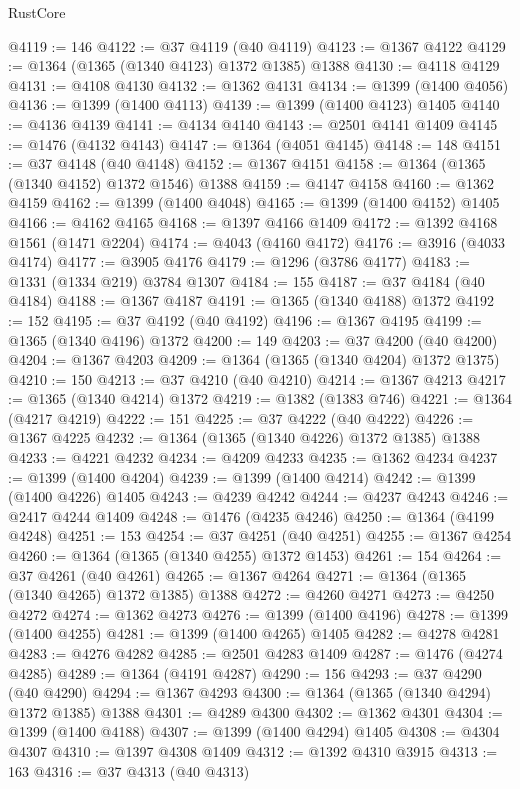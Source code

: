 \begin{lexlean}{RustCore}
\begin{coremodule}
@4119 := 146
@4122 := @37 @4119 (@40 @4119)
@4123 := @1367 @4122
@4129 := @1364 (@1365 (@1340 @4123) @1372 @1385) @1388
@4130 := @4118 @4129
@4131 := @4108 @4130
@4132 := @1362 @4131
@4134 := @1399 (@1400 @4056)
@4136 := @1399 (@1400 @4113)
@4139 := @1399 (@1400 @4123) @1405
@4140 := @4136 @4139
@4141 := @4134 @4140
@4143 := @2501 @4141 @1409
@4145 := @1476 (@4132 @4143)
@4147 := @1364 (@4051 @4145)
@4148 := 148
@4151 := @37 @4148 (@40 @4148)
@4152 := @1367 @4151
@4158 := @1364 (@1365 (@1340 @4152) @1372 @1546) @1388
@4159 := @4147 @4158
@4160 := @1362 @4159
@4162 := @1399 (@1400 @4048)
@4165 := @1399 (@1400 @4152) @1405
@4166 := @4162 @4165
@4168 := @1397 @4166 @1409
@4172 := @1392 @4168 @1561 (@1471 @2204)
@4174 := @4043 (@4160 @4172)
@4176 := @3916 (@4033 @4174)
@4177 := @3905 @4176
@4179 := @1296 (@3786 @4177)
@4183 := @1331 (@1334 @219) @3784 @1307
@4184 := 155
@4187 := @37 @4184 (@40 @4184)
@4188 := @1367 @4187
@4191 := @1365 (@1340 @4188) @1372
@4192 := 152
@4195 := @37 @4192 (@40 @4192)
@4196 := @1367 @4195
@4199 := @1365 (@1340 @4196) @1372
@4200 := 149
@4203 := @37 @4200 (@40 @4200)
@4204 := @1367 @4203
@4209 := @1364 (@1365 (@1340 @4204) @1372 @1375)
@4210 := 150
@4213 := @37 @4210 (@40 @4210)
@4214 := @1367 @4213
@4217 := @1365 (@1340 @4214) @1372
@4219 := @1382 (@1383 @746)
@4221 := @1364 (@4217 @4219)
@4222 := 151
@4225 := @37 @4222 (@40 @4222)
@4226 := @1367 @4225
@4232 := @1364 (@1365 (@1340 @4226) @1372 @1385) @1388
@4233 := @4221 @4232
@4234 := @4209 @4233
@4235 := @1362 @4234
@4237 := @1399 (@1400 @4204)
@4239 := @1399 (@1400 @4214)
@4242 := @1399 (@1400 @4226) @1405
@4243 := @4239 @4242
@4244 := @4237 @4243
@4246 := @2417 @4244 @1409
@4248 := @1476 (@4235 @4246)
@4250 := @1364 (@4199 @4248)
@4251 := 153
@4254 := @37 @4251 (@40 @4251)
@4255 := @1367 @4254
@4260 := @1364 (@1365 (@1340 @4255) @1372 @1453)
@4261 := 154
@4264 := @37 @4261 (@40 @4261)
@4265 := @1367 @4264
@4271 := @1364 (@1365 (@1340 @4265) @1372 @1385) @1388
@4272 := @4260 @4271
@4273 := @4250 @4272
@4274 := @1362 @4273
@4276 := @1399 (@1400 @4196)
@4278 := @1399 (@1400 @4255)
@4281 := @1399 (@1400 @4265) @1405
@4282 := @4278 @4281
@4283 := @4276 @4282
@4285 := @2501 @4283 @1409
@4287 := @1476 (@4274 @4285)
@4289 := @1364 (@4191 @4287)
@4290 := 156
@4293 := @37 @4290 (@40 @4290)
@4294 := @1367 @4293
@4300 := @1364 (@1365 (@1340 @4294) @1372 @1385) @1388
@4301 := @4289 @4300
@4302 := @1362 @4301
@4304 := @1399 (@1400 @4188)
@4307 := @1399 (@1400 @4294) @1405
@4308 := @4304 @4307
@4310 := @1397 @4308 @1409
@4312 := @1392 @4310 @3915
@4313 := 163
@4316 := @37 @4313 (@40 @4313)

\end{coremodule}
\end{lexlean}
